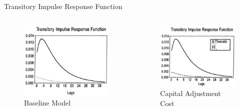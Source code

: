 \documentclass[10pt]{beamer}
\begin{document}
		      		\begin{frame}{Transitory Impulse Response Function}
		      			\begin{columns}[T,onlytextwidth]
		      				\begin{figure}
		      					\centering
		      					\includegraphics[width=\linewidth]{figures/Base_trans_IRF.png}
		      					\caption{Baseline Model}
		      				\end{figure}
		      				
		      				\begin{figure}
		      					\centering
		      					\includegraphics[width=\linewidth]{figures/K_trans_IRF.png}
		      					\caption{Capital Adjustment Cost}
		      				\end{figure}
		      				

\end{columns}
\end{frame}
\end{document}
